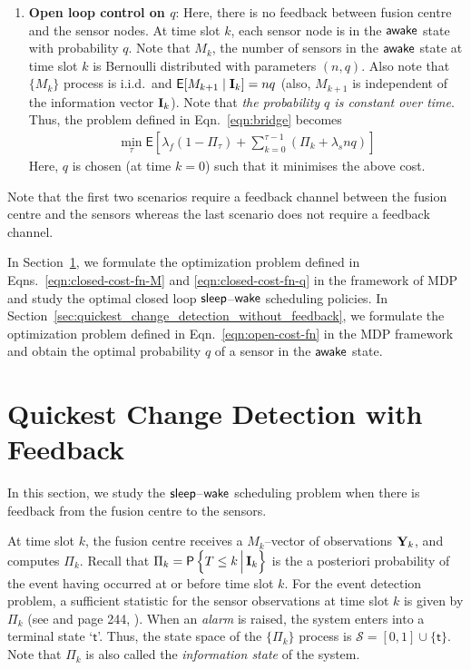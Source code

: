 \documentclass[journal]{IEEEtran}
\newcommand{\sleep}{{${\sf sleep }$}}
\newcommand{\wake}{{${\sf awake }$}}
\newcommand{\EXP}[1]{\mathsf{E}\!\left[#1\right]}
\begin{document}
\begin{enumerate}
\item {\bf Open loop control on $q$}: Here, there is no feedback between
      fusion centre and the sensor nodes. 
      At time slot $k$, each sensor node is in the {\wake} state with 
	  probability $q$. Note that $M_k$, the number of sensors in the
	  {\wake} state at time slot $k$ is Bernoulli distributed with
	  parameters $(n,q)$. Also note that $\{M_k\}$ process is i.i.d.\
	  and $\EXP{M_{k+1}\mid {\bf I}_k} = nq$ (also, $M_{k+1}$
	  is independent of the information vector ${\bf I}_k$). Note that
	  {\em the probability $q$ is constant over time}. Thus, the problem
	  defined in Eqn.~\ref{eqn:bridge} becomes 
      \begin{eqnarray}
      \label{eqn:open-cost-fn}
       \min_{\tau}  \EXP{ \lambda_f  (1-\Pi_{\tau}) + \sum_{k=0}^{\tau-1} \left(\Pi_k
	   + \lambda_s  nq\right)}
      \end{eqnarray}
      Here, $q$ is chosen (at time $k=0$) such that it minimises the above cost.  
\end{enumerate}
Note that the first two scenarios require a feedback channel between the
fusion centre and the sensors whereas the last scenario does not require
a feedback channel.

In Section~\ref{sec:quickest_change_detection_with_feedback}, we
formulate the optimization problem defined in
Eqns.~\ref{eqn:closed-cost-fn-M} and \ref{eqn:closed-cost-fn-q} in
the framework of MDP and study the optimal
closed loop \sleep--${\sf wake}$ scheduling policies. In
Section~\ref{sec:quickest_change_detection_without_feedback}, we
formulate the optimization problem defined in
Eqn.~\ref{eqn:open-cost-fn} in the MDP framework and obtain the
optimal probability $q$ of a sensor in the {\wake} state. 



\section{Quickest Change Detection with Feedback}
\label{sec:quickest_change_detection_with_feedback}
In this section, we study the \sleep--${\sf wake}$ scheduling problem when 
there is feedback from the fusion centre to the sensors. 

At time slot $k$, the fusion centre receives a $M_k$--vector of
observations ${\bf Y}_k$, and computes $\Pi_k$. Recall that $\Pi_k =
\mathsf{P}\left\{T\le k \Big \arrowvert {\bf I}_k\right\}$ is the a
posteriori probability of the event having occurred at or before time
slot $k$. For the event detection problem, a sufficient statistic for
the sensor observations at time slot $k$ is given by $\Pi_k$ (see
\cite{ss} and page 244, \cite{books.bertsekas00a}). When an {\em alarm} is raised, the system enters into a
terminal state `$\mathsf{t}$'. Thus, the state space of the $\{\Pi_k\}$
process is  ${\mathcal S} = [0, 1] \cup \{ \mathsf{t} \}$.
Note that $\Pi_k$ is also called the {\em information state} of the system. 
\end{document}
